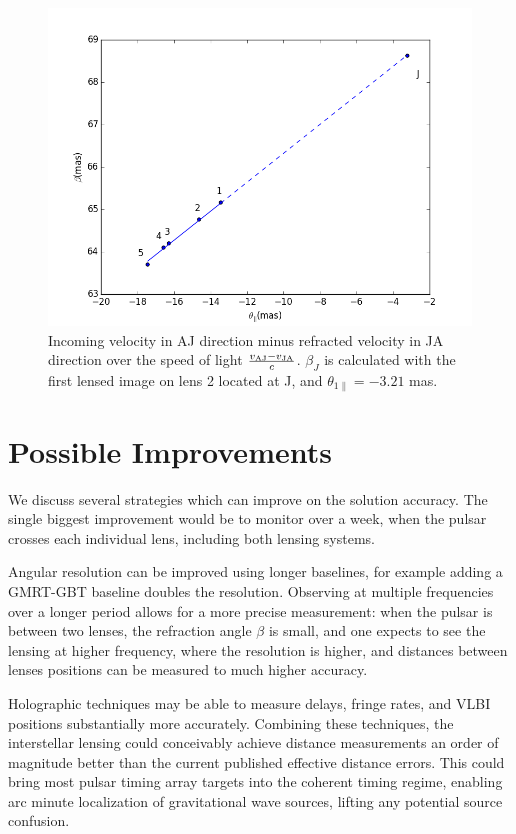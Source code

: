\documentclass[useAMS,usenatbib]{mn2e}
\begin{document}
\begin{figure}
\centering
\includegraphics[width=1.0\linewidth,angle=0]{Reflection_angle.png}
\caption{Incoming velocity in AJ direction minus refracted velocity in JA direction over the speed of light $ \frac{v_{\rm AJ}-v_{\rm JA}}{c}$. $\beta_J$ is calculated with the first lensed image on lens 2 located at J, and $\theta_{1\parallel}=-3.21$ mas.}
\label{vtrans}
\end{figure}



\section{Possible Improvements}

We discuss several strategies which can improve on the solution
accuracy.  The single biggest improvement would be to monitor over a
week, when the pulsar crosses each individual lens, including both
lensing systems.

Angular resolution can be improved using longer baselines, for example
adding a GMRT-GBT baseline doubles the resolution.  Observing at
multiple frequencies over a longer period allows for a more precise
measurement: when the pulsar is between two lenses, the refraction
angle $\beta$ is small, and one expects to see the lensing at higher
frequency, where the resolution is higher, and distances between
lenses positions can be measured to much higher accuracy.

Holographic techniques \citep{2008MNRAS.388.1214W,2014MNRAS.440L..36P}
may be able to measure delays, fringe rates, and VLBI positions
substantially more accurately.  Combining these techniques, the
interstellar lensing could conceivably achieve distance measurements
an order of magnitude better than the current published effective
distance errors.  This could bring most pulsar timing array targets
into the coherent timing regime, enabling arc minute localization of
gravitational wave sources, lifting any potential source confusion.
\end{document}

